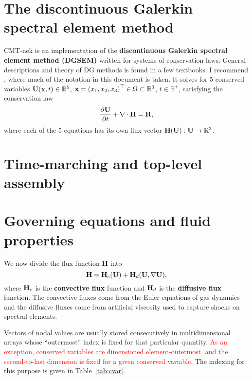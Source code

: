 \chapter{The discontinuous Galerkin spectral element method}
CMT-nek is an implementation of the
\textbf{discontinuous Galerkin spectral element method (DGSEM)} written for
systems of conservation laws. General descriptions and theory of DG methods is
found in a few textbooks. I recommend \cite{hw08,CHQZ3}, where much of the notation
in this document is taken.
It solves for 5 conserved variables ${\bf U}(\mathbf{x},t) \in \mathbb{R}^5$, 
$\mathbf{x} =\left(x_1,x_2,x_3\right)^{\top} \in \Omega \subset \mathbb{R}^3$, $t\in\mathbb{R}^+$,
satisfying the conservation law
\begin{equation}
\frac{\partial {\bf U}}{\partial t} + \nabla \cdot {\bf H}=\mathbf{R},
\label{claw}
\end{equation}
where each of the 5 equations has its own flux vector
${\bf H}({\bf U}) : {\bf U} \rightarrow \mathbb{R}^3$.





\chapter{Time-marching and top-level assembly}



\chapter{Governing equations and fluid properties}
We now divide the flux function $\mathbf{H}$ into
\begin{equation}
{\bf H}={\bf H}_c({\bf U})+{\bf H}_d({\bf U},\nabla {\bf U}),
\label{convanddiff}
\end{equation}
where ${\bf H}_c$ is the \textbf{convective flux} function and ${\bf H}_d$ is the \textbf{diffusive flux} function.
The convective fluxes come from the Euler equations of gas dynamics and the diffusive
fluxes come from artificial viscosity used to capture shocks on spectral elements.


Vectors of nodal values are usually stored consecutively in
multidimensional arrays whose ``outermost'' index is fixed for that particular quantity.
\textcolor{red}{As an exception, conserved variables are dimensioned element-outermost, and the second-to-last dimension
is fixed for a given conserved variable.} The indexing for this purpose is given in Table~\ref{tab:cvar}.

